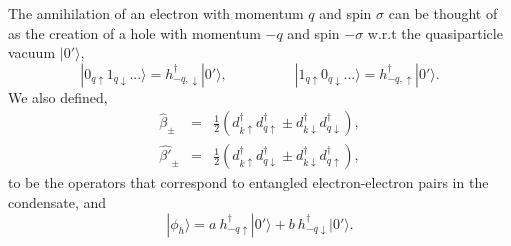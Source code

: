 \documentclass[12pt,letterpaper,aps,onecolumn,superscriptaddress,floatfix,notitlepage]{revtex4-1}
\begin{document}
	The annihilation of an electron with momentum $q$ and spin $\sigma$ can be thought of as the creation of a hole with momentum $-q$ and spin $-\sigma$ w.r.t the quasiparticle vacuum $|0'\rangle$,
	\begin{equation}|0_{q\uparrow}1_{q\downarrow}...\rangle =h^{\dagger}_{-q,\downarrow}|0'\rangle,\hspace{2cm}|1_{q\uparrow}0_{q\downarrow}...\rangle = h^{\dagger}_{-q,\uparrow}|0'\rangle.\end{equation}
	We also defined,  \begin{eqnarray}\label{eq:triplet}\hat{\beta}_{\pm} &=& \frac{1}{2}(d^{\dagger}_{k\uparrow}d^{\dagger}_{q\uparrow}\pm d^{\dagger}_{k\downarrow}d^{\dagger}_{q\downarrow}),\\\label{eq:singlet}\hat{\beta'}_{\pm} &=& \frac{1}{2}(d^{\dagger}_{k\uparrow}d^{\dagger}_{q\downarrow}\pm d^{\dagger}_{k\downarrow}d^{\dagger}_{q\uparrow}),\end{eqnarray} to be the operators that correspond to entangled electron-electron pairs in the condensate, and \begin{equation}|\phi_{h}\rangle = a~h_{-q\uparrow}^{\dagger}|0'\rangle+b~h_{-q\downarrow}^{\dagger}|0'\rangle.\end{equation}
	
\end{document}
